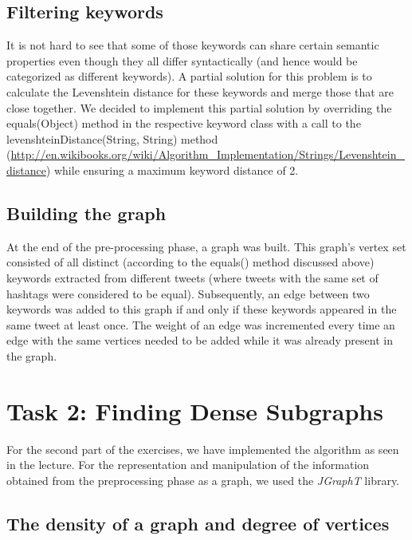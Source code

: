 \documentclass[10pt,a4paper]{article}
\begin{document}
\subsection{Filtering keywords}
It is not hard to see that some of those keywords can share certain semantic properties even though they all differ syntactically (and hence would be categorized as different keywords). A partial solution for this problem is to calculate the Levenshtein distance for these keywords and merge those that are close together. We decided to implement this partial solution by overriding the equals(Object) method in the respective keyword class with a call to the levenshteinDistance(String, String) method (\url{http://en.wikibooks.org/wiki/Algorithm_Implementation/Strings/Levenshtein_distance}) while ensuring a maximum keyword distance of 2.
\subsection{Building the graph}
At the end of the pre-processing phase, a graph was built. This graph's vertex set consisted of all distinct (according to the equals() method discussed above) keywords extracted from different tweets (where tweets with the same set of hashtags were considered to be equal). Subsequently, an edge between two keywords was added to this graph if and only if these keywords appeared in the same tweet at least once. The weight of an edge was incremented every time an edge with the same vertices needed to be added while it was already present in the graph.
\section{Task 2: Finding Dense Subgraphs}

For the second part of the exercises, we have implemented the algorithm as seen in the lecture.
For the representation and manipulation of the information obtained from the preprocessing phase as a graph, we used the \emph{JGraphT} library.

\subsection{The density of a graph and degree of vertices}
\end{document}
